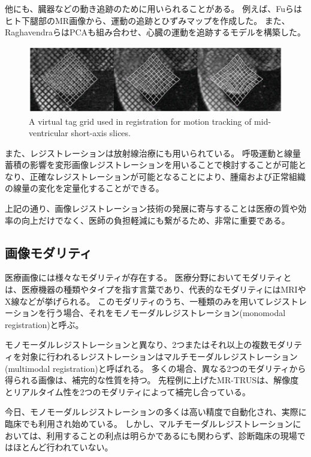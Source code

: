     他にも、臓器などの動き追跡のために用いられることがある。
    例えば、Fuら\cite{fu2011motion}はヒト下腿部のMR画像から、運動の追跡とひずみマップを作成した。
    また、Raghavendraら\cite{chandrashekara2003construction}はPCAも組み合わせ、心臓の運動を追跡するモデルを構築した。
    \begin{figure}[ht]
      \centering
      \includegraphics[width=14cm]{1_intro/img/heart_registration.png}
      \caption{A virtual tag grid used in registration for motion tracking of mid-ventricular short-axis slices\cite{chandrashekara2003construction}.}
    \end{figure}

    また、レジストレーションは放射線治療にも用いられている\cite{velec2011effect}。
    呼吸運動と線量蓄積の影響を変形画像レジストレーションを用いることで検討することが可能となり、正確なレジストレーションが可能となることにより、腫瘍および正常組織の線量の変化を定量化することができる。

    上記の通り、画像レジストレーション技術の発展に寄与することは医療の質や効率の向上だけでなく、医師の負担軽減にも繋がるため、非常に重要である。

\subsection{画像モダリティ}
    医療画像には様々なモダリティが存在する。
    医療分野においてモダリティとは、医療機器の種類やタイプを指す言葉であり、代表的なモダリティにはMRIやX線などが挙げられる。
    このモダリティのうち、一種類のみを用いてレジストレーションを行う場合、それをモノモーダルレジストレーション(monomodal registration)と呼ぶ。

    モノモーダルレジストレーションと異なり、2つまたはそれ以上の複数モダリティを対象に行われるレジストレーションはマルチモーダルレジストレーション(multimodal registration)と呼ばれる。
    多くの場合、異なる2つのモダリティから得られる画像は、補完的な性質を持つ。
    先程例に上げたMR-TRUSは、解像度とリアルタイム性を2つのモダリティによって補完し合っている。

    今日、モノモーダルレジストレーションの多くは高い精度で自動化され、実際に臨床でも利用され始めている。
    しかし、マルチモーダルレジストレーションにおいては、利用することの利点は明らかであるにも関わらず、診断臨床の現場ではほとんど行われていない\cite{viergever2016survey}。

